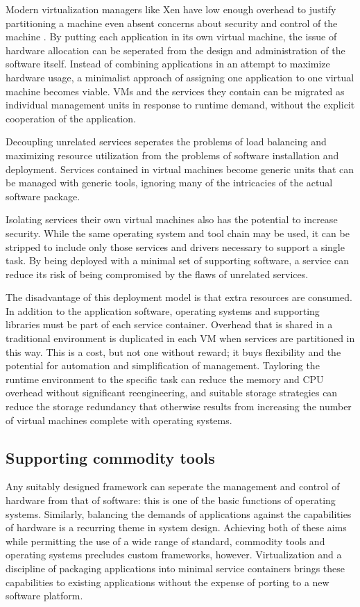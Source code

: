 Modern virtualization managers like Xen have low enough overhead to justify partitioning a machine even absent concerns about security and control of the machine \cite{barham}. By putting each application in its own virtual machine, the issue of hardware allocation can be seperated from the design and administration of the software itself. Instead of combining applications in an attempt to maximize hardware usage, a minimalist approach of assigning one application to one virtual machine becomes viable. VMs and the services they contain can be migrated as individual management units in response to runtime demand, without the explicit cooperation of the application.

Decoupling unrelated services seperates the problems of load balancing and maximizing resource utilization from the problems of software installation and deployment. Services contained in virtual machines become generic units that can be managed with generic tools, ignoring many of the intricacies of the actual software package.

Isolating services their own virtual machines also has the potential to increase security. While the same operating system and tool chain may be used, it can be stripped to include only those services and drivers necessary to support a single task. By being deployed with a minimal set of supporting software, a service can reduce its risk of being compromised by the flaws of unrelated services.

The disadvantage of this deployment model is that extra resources are consumed. In addition to the application software, operating systems and supporting libraries must be part of each service container. Overhead that is shared in a traditional environment is duplicated in each VM when services are partitioned in this way. This is a cost, but not one without reward; it buys flexibility and the potential for automation and simplification of management. Tayloring the runtime environment to the specific task can reduce the memory and CPU overhead without significant reengineering, and suitable storage strategies can reduce the storage redundancy that otherwise results from increasing the number of virtual machines complete with operating systems.

\subsection{Supporting commodity tools}

Any suitably designed framework can seperate the management and control of hardware from that of software: this is one of the basic functions of operating systems. Similarly, balancing the demands of applications against the capabilities of hardware is a recurring theme in system design. Achieving both of these aims while permitting the use of a wide range of standard, commodity tools and operating systems precludes custom frameworks, however. Virtualization and a discipline of packaging applications into minimal service containers brings these capabilities to existing applications without the expense of porting to a new software platform.


